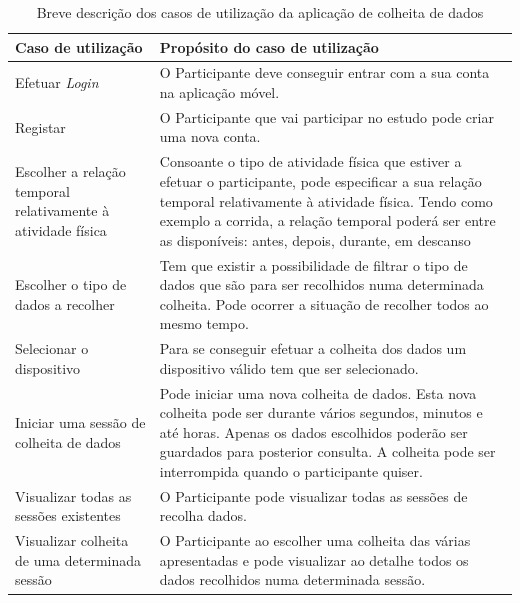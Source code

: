 \begin{table}[H]
\centering

\begin{tabularx}{1\textwidth}{|p{4cm}|p{10.7cm}|}
\rowcolor[HTML]{FFCE93} \hline
\textbf{Caso de utilização} &  \textbf{Propósito do caso de utilização}  \\
\hline
Efetuar \textit{Login}  & O Participante deve conseguir entrar com a sua conta na aplicação móvel. \\ \hline

Registar & O Participante que vai participar no estudo pode criar uma nova  conta. \\ \hline

Escolher a relação temporal relativamente à atividade física & Consoante o tipo de atividade física que estiver a efetuar o participante, pode especificar a sua relação temporal relativamente à atividade física. Tendo como exemplo a corrida, a relação temporal poderá ser entre as disponíveis: antes, depois, durante, em descanso\\ \hline

Escolher o tipo de dados a recolher & Tem que existir a possibilidade de filtrar o tipo de dados que são para ser recolhidos numa determinada colheita. Pode ocorrer a situação de recolher todos ao mesmo tempo. \\ \hline

Selecionar o dispositivo  & Para se conseguir efetuar a colheita dos dados um dispositivo válido tem que ser selecionado. \\ \hline

Iniciar uma sessão de colheita de dados & Pode iniciar uma nova colheita de dados. Esta nova colheita pode ser durante vários segundos, minutos e até horas. Apenas os dados escolhidos poderão ser guardados para posterior consulta. A colheita pode ser interrompida quando o participante quiser. \\ \hline

Visualizar todas as sessões existentes & O Participante pode visualizar todas as sessões de recolha dados. \\ \hline

Visualizar colheita de uma determinada sessão & O Participante ao escolher uma colheita das várias apresentadas e pode visualizar ao detalhe todos os dados recolhidos numa determinada sessão. \\ \hline    

\end{tabularx}

\caption{Breve descrição dos casos de utilização da aplicação de colheita de dados}
\label{t:android-usecase}
\end{table}

